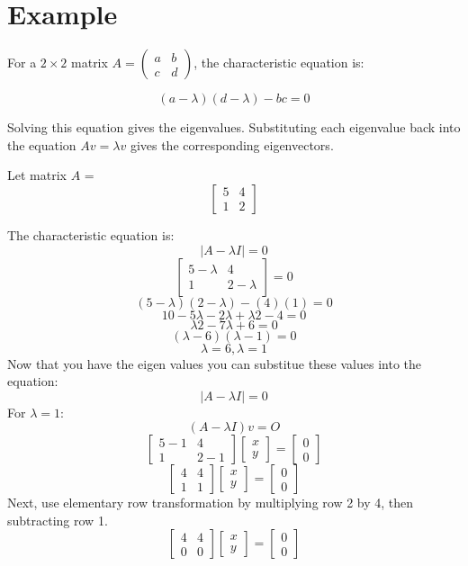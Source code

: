 \section{Example}

For a $2 \times 2$ matrix $A = \begin{pmatrix} a & b \\ c &
  d \end{pmatrix}$, the characteristic equation is:

\begin{equation}
(a - \lambda)(d - \lambda) - bc = 0
\end{equation}

Solving this equation  gives the eigenvalues. Substituting each
eigenvalue back into the equation $Av = \lambda v$ gives the
corresponding eigenvectors.

Let matrix $A$ =
$$\begin{bmatrix}
5 & 4\\
 1 & 2 
\end{bmatrix} $$

The characteristic equation is: 
$$|A - \lambda I| = 0$$ 
$$\begin{bmatrix}
5 - \lambda & 4\\
 1 & 2- \lambda
\end{bmatrix} = 0$$
$$(5 - \lambda) (2 - \lambda) - (4)(1) = 0$$
$$10 - 5\lambda - 2\lambda + \lambda2 - 4 = 0$$
$$\lambda2 - 7\lambda + 6 = 0$$
$$(\lambda - 6)(\lambda - 1) = 0$$
$$\lambda = 6, \lambda = 1$$
Now that you have the eigen values you can substitue these values into the equation: 
$$|A - \lambda I| = 0$$ 
For $λ = 1$:
$$(A - \lambda I) v = O$$
$$\begin{bmatrix}
5-1 & 4 \\
1 & 2-1 
\end{bmatrix}
\begin{bmatrix}
x \\
y 
\end{bmatrix} = 
\begin{bmatrix}
0 \\
0 
\end{bmatrix}$$
$$\begin{bmatrix}
4 & 4\\
1 & 1 
\end{bmatrix}
\begin{bmatrix}
x  \\
y 
\end{bmatrix} = 
\begin{bmatrix}
0  \\
0 
\end{bmatrix}$$
Next, use elementary row transformation by multiplying row 2 by 4, then subtracting row 1.
$$\begin{bmatrix}
4 & 4\\
0 & 0 
\end{bmatrix}
\begin{bmatrix}
x \\
y 
\end{bmatrix} = 
\begin{bmatrix}
0\\
0
\end{bmatrix}$$

